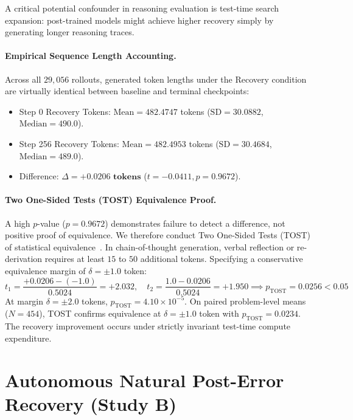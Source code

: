 \documentclass[11pt]{article}
\begin{document}
A critical potential confounder in reasoning evaluation is test-time search expansion: post-trained models might achieve higher recovery simply by generating longer reasoning traces.

\paragraph{Empirical Sequence Length Accounting.}
Across all $29,056$ rollouts, generated token lengths under the Recovery condition are virtually identical between baseline and terminal checkpoints:
\begin{itemize}
    \item Step 0 Recovery Tokens: $\text{Mean} = 482.4747$ tokens ($\text{SD} = 30.0882$, $\text{Median} = 490.0$).
    \item Step 256 Recovery Tokens: $\text{Mean} = 482.4953$ tokens ($\text{SD} = 30.4684$, $\text{Median} = 489.0$).
    \item Difference: $\Delta = \mathbf{+0.0206\text{ tokens}}$ ($t = -0.0411, p = 0.9672$).
\end{itemize}

\paragraph{Two One-Sided Tests (TOST) Equivalence Proof.}
A high $p$-value ($p = 0.9672$) demonstrates failure to detect a difference, not positive proof of equivalence. We therefore conduct Two One-Sided Tests (TOST) of statistical equivalence~\cite{Schuirmann1987Comparison}. In chain-of-thought generation, verbal reflection or re-derivation requires at least $15$ to $50$ additional tokens. Specifying a conservative equivalence margin of $\delta = \pm 1.0$ token:
\begin{equation}
t_1 = \frac{+0.0206 - (-1.0)}{0.5024} = +2.032, \quad t_2 = \frac{1.0 - 0.0206}{0.5024} = +1.950 \implies p_{\text{TOST}} = \mathbf{0.0256} < 0.05
\end{equation}
At margin $\delta = \pm 2.0$ tokens, $p_{\text{TOST}} = 4.10 \times 10^{-5}$. On paired problem-level means ($N=454$), TOST confirms equivalence at $\delta = \pm 1.0$ token with $p_{\text{TOST}} = \mathbf{0.0234}$. The recovery improvement occurs under strictly invariant test-time compute expenditure.

\section{Autonomous Natural Post-Error Recovery (Study B)}
\end{document}
